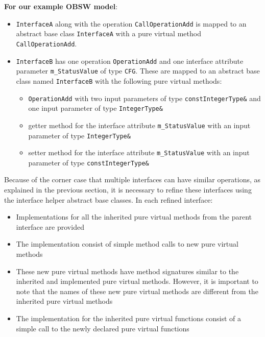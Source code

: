 \textbf{For our example OBSW model}:
\begin{itemize}
\item \texttt{InterfaceA} along with the operation \texttt{CallOperationAdd} is mapped to an abstract base class \texttt{InterfaceA} with a pure virtual method \texttt{CallOperationAdd}. 
\item \texttt{InterfaceB} has one operation \texttt{OperationAdd} and one interface attribute parameter \texttt{m\_StatusValue} of type \texttt{CFG}. These are mapped to an abstract base class named \texttt{InterfaceB} with the following pure virtual methods:
\begin{itemize}
\item \texttt{OperationAdd} with two input parameters of type \texttt{const\allowbreak  IntegerType\&} and one input parameter of type \texttt{IntegerType\&}
\item getter method for the interface attribute \texttt{m\_StatusValue} with an input parameter of type \texttt{IntegerType\&}
\item setter method for the interface attribute \texttt{m\_StatusValue} with an input parameter of type \texttt{const\allowbreak  IntegerType\&}
\end{itemize} 
\end{itemize}

Because of the corner case that multiple interfaces can have similar operations, as explained in the previous section, it is necessary to refine these interfaces using the interface helper abstract base classes. In each refined interface:
\begin{itemize}
\item Implementations for all the inherited pure virtual methods from the parent interface are provided
\item The implementation consist of simple method calls to new pure virtual methods
\item These new pure virtual methods have method signatures similar to the inherited and implemented pure virtual methods. However, it is important to note that the names of these new pure virtual methods are different from the inherited pure virtual methods
\item The implementation for the inherited pure virtual functions consist of a simple call to the newly declared pure virtual functions
\end{itemize}

